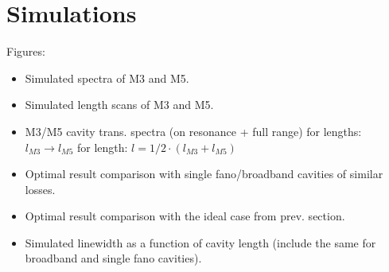 \section{Simulations}

Figures:
\begin{itemize}
    \item Simulated spectra of M3 and M5.
    \item Simulated length scans of M3 and M5.
    \item M3/M5 cavity trans. spectra (on resonance + full range)
    \subitem for lengths: $l_{M3} \rightarrow l_{M5}$
    \subitem for length: $l = 1/2 \cdot (l_{M3} + l_{M5})$
    \item Optimal result comparison with single fano/broadband cavities of similar losses.
    \item Optimal result comparison with the ideal case from prev. section.
    \item Simulated linewidth as a function of cavity length (include the same for broadband and single fano cavities).
\end{itemize}